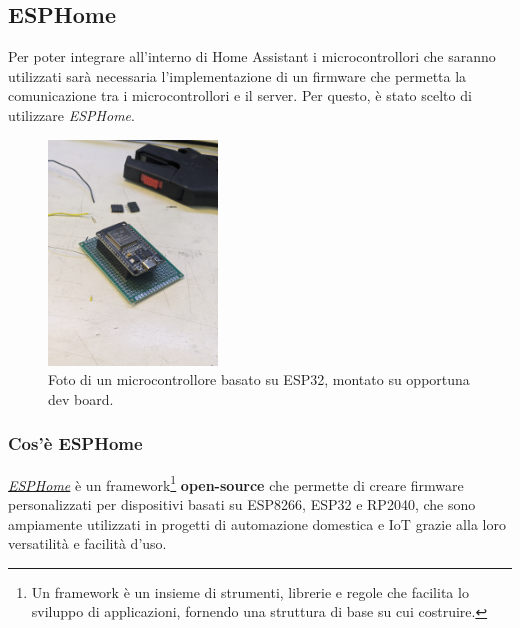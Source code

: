 \documentclass[11pt, a4paper]{article}
\begin{document}
\subsection{ESPHome}

Per poter integrare all'interno di Home Assistant i microcontrollori che saranno utilizzati sarà necessaria
l'implementazione di un firmware che permetta la comunicazione tra i microcontrollori e il server.
Per questo, è stato scelto di utilizzare \textit{ESPHome}.

\begin{figure}[h!]
    \centering
    \includegraphics[width=0.4\textwidth]{media/mio-esp-32.jpg}
    \caption{Foto di un microcontrollore basato su ESP32, montato su opportuna dev board.}
    \label{fig:esphome-dashboard}
\end{figure}

\subsubsection{Cos'è ESPHome}
\href{https://esphome.io}{\textit{ESPHome}} è un 
framework\footnote{Un framework è un insieme di strumenti, librerie e regole che facilita 
lo sviluppo di applicazioni, fornendo una struttura di base su cui costruire.} 
\textbf{open-source} che permette di 
creare firmware personalizzati per dispositivi basati su ESP8266, ESP32 e RP2040,
che sono ampiamente utilizzati in progetti di automazione domestica e IoT grazie alla loro versatilità e facilità d'uso.
\end{document}
